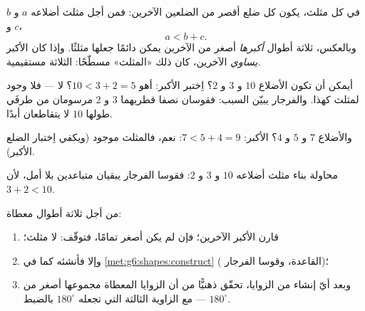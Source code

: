 \begin{theorem}\label{thm:g7:triangles:inequality}
في كل مثلث، يكون كل ضلع أقصر من  الضلعين
الآخرين: فمن أجل مثلث أضلاعه $a$ و $b$ و $c$،
\[
a < b + c .
\]
وبالعكس، ثلاثة أطوال \emph{أكبرها} أصغر من 
الآخرين يمكن دائمًا جعلها مثلثًا. وإذا كان الأكبر
\emph{يساوي}  الآخرين، كان ذلك «المثلث» مسطّحًا: 
الثلاثة مستقيمية.
\end{theorem}
\admitted

\begin{example}\label{ex:g7:triangles:inequality}
أيمكن أن تكون الأضلاع $10$ و $3$ و $2$؟ اِختبر الأكبر: أهو $10 < 3 + 2 = 5$؟
لا --- فلا وجود لمثلث كهذا. والفرجار يبيّن السبب: فقوسان نصفا قطريهما
$3$ و $2$ مرسومان من طرفَي  طولها $10$ لا يتقاطعان
أبدًا.

والأضلاع $7$ و $5$ و $4$؟ الأكبر: $7 < 5 + 4 = 9$: نعم، فالمثلث
موجود (ويكفي اِختبار الضلع الأكبر).
\end{example}

\begin{omfigure}

{\small محاولة بناء مثلث أضلاعه $10$ و $3$ و $2$: فقوسا
الفرجار يبقيان متباعدين بلا أمل، لأن $3 + 2 < 10$.}
\end{omfigure}

\begin{method}\label{met:g7:triangles:construct}
من أجل ثلاثة أطوال معطاة:
\begin{enumerate}
  \item قارن الأكبر  الآخرين؛ فإن لم يكن
        أصغر تمامًا، فتوقّف: لا مثلث؛
  \item وإلا فأنشئه كما في \cref{met:g6:shapes:construct}
        ( القاعدة، وقوسا الفرجار)؛
  \item وبعد أيّ إنشاء من الزوايا، تحقّق ذهنيًّا من أن
        الزوايا المعطاة مجموعها أصغر من $180^\circ$ --- مع الزاوية
        الثالثة التي تجعله $180^\circ$ بالضبط.
\end{enumerate}
\end{method}

